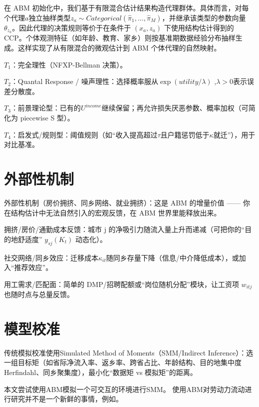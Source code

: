 \documentclass[
  a4paper,
  zihao=-4,
  fontset=mac,
  AutoFakeBold,
  AutoFakeSlant,
  oneside]{ctexbook}
\begin{document}
在 ABM 初始化中，我们基于有限混合估计结果构造代理群体。具体而言，对每个代理$a$独立抽样类型$z_a\sim Categorical(\hat \pi_1,\dots,\hat \pi_M)$，并继承该类型的参数向量 $\theta_{z_a}$。因此代理的决策规则等价于在条件于 $(x_a,z_a)$ 下使用结构估计得到的 CCP。个体观测特征（如年龄、教育、家乡）则按基准期数据经验分布抽样生成。这样实现了从有限混合的微观估计到 ABM 个体代理的自然映射。




$𝑇_1$：完全理性（NFXP-Bellman 决策）。

$𝑇_2$：Quantal Response / 噪声理性：选择概率服从$\exp(utility/\lambda)$ ,$\lambda>0$表示误差分散度。

$𝑇_3$：前景理论型：已有的$U^{income}$继续保留；再允许损失厌恶参数、概率加权（可简化为 piecewise S 型）。

$T_4$：启发式/规则型：阈值规则（如“收入提高超过$\tau$且户籍惩罚低于$\kappa$就迁”），用于对比基准。





\section{外部性机制} %
\label{sec:外部性机制}

外部性机制（房价拥挤、同乡网络、就业拥挤）：这是 ABM 的增量价值 —— 你在结构估计中无法自然引入的宏观反馈，在 ABM 世界里能释放出来。

拥挤/房价/通勤成本反馈：城市 j 的净吸引力随流入量上升而递减（可把你的“目的地舒适度” $y_{sj}(K_t)$ 动态化）。

社交网络/同乡效应：迁移成本$\kappa_{it}$随同乡存量下降（信息/中介降低成本），或加入“推荐效应”。

用工需求/匹配面：简单的 DMP/招聘配额或“岗位随机分配”模块，让工资项 $w_{itj}$ 也随时点与总量反馈。



\section{模型校准} %
\label{sub:模型校准}





传统模拟校准使用Simulated Method of Moments（SMM/Indirect Inference）：选一组目标矩（如省际净流入率、返乡率、跨省占比、年龄结构、目的地集中度 Herfindahl、同乡聚集度），最小化“数据矩 vs 模拟矩”的距离。

本文尝试使用ABM模拟一个可交互的环境进行SMM。
使用ABM对劳动力流动进行研究并不是一个新鲜的事情，例如\textcite{fuAgentBasedModelingChinas2018,klabundeDecisionmakingAgentbasedModels2016}。
\end{document}
